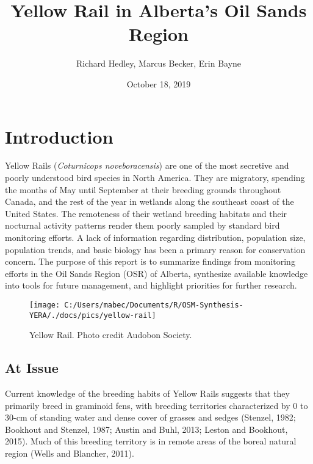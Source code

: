 \documentclass[11pt,]{article}
\title{Yellow Rail in Alberta's Oil Sands Region}
\author{Richard Hedley, Marcus Becker, Erin Bayne}
\date{October 18, 2019}
\begin{document}
\maketitle

{
\hypersetup{linkcolor=black}
\setcounter{tocdepth}{4}
\tableofcontents
}
\clearpage

\section{Introduction}\label{introduction}

Yellow Rails (\emph{Coturnicops noveboracensis}) are one of the most
secretive and poorly understood bird species in North America. They are
migratory, spending the months of May until September at their breeding
grounds throughout Canada, and the rest of the year in wetlands along
the southeast coast of the United States. The remoteness of their
wetland breeding habitats and their nocturnal activity patterns render
them poorly sampled by standard bird monitoring efforts. A lack of
information regarding distribution, population size, population trends,
and basic biology has been a primary reason for conservation concern.
The purpose of this report is to summarize findings from monitoring
efforts in the Oil Sands Region (OSR) of Alberta, synthesize available
knowledge into tools for future management, and highlight priorities for
further research.

\begin{figure}[H]

{\centering \texttt{[image: C:/Users/mabec/Documents/R/OSM-Synthesis-YERA/./docs/pics/yellow-rail]} 

}

\caption{Yellow Rail. Photo credit  Audobon Society.}\label{fig:yera-pic}
\end{figure}

\subsection{At Issue}\label{at-issue}

Current knowledge of the breeding habits of Yellow Rails suggests that
they primarily breed in graminoid fens, with breeding territories
characterized by 0 to 30-cm of standing water and dense cover of grasses
and sedges (Stenzel, 1982; Bookhout and Stenzel, 1987; Austin and Buhl,
2013; Leston and Bookhout, 2015). Much of this breeding territory is in
remote areas of the boreal natural region (Wells and Blancher, 2011).
\end{document}
